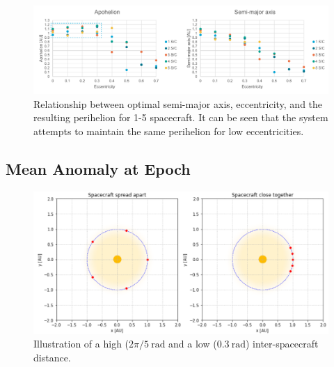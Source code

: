 \begin{figure}[htbp]
 \centering
 \includegraphics[width=1.0\textwidth]{img/eccentricity_optimal.pdf}
 \caption{Relationship between optimal semi-major axis, eccentricity, and the resulting perihelion for 1-5 spacecraft. It can be seen that the system attempts to maintain the same perihelion for low eccentricities.}
 \label{fig:eccentricity_optimal}
\end{figure}


\subsection{Mean Anomaly at Epoch}
\begin{figure}
 \centering
 \includegraphics[width=1.0\textwidth]{img/spread_illustration.png}
 \caption{Illustration of a high ($2\pi/5~\mathrm{rad}$ and a low ($0.3~\mathrm{rad}$) inter-spacecraft distance.}
 \label{fig:spread_illustration}
\end{figure}

